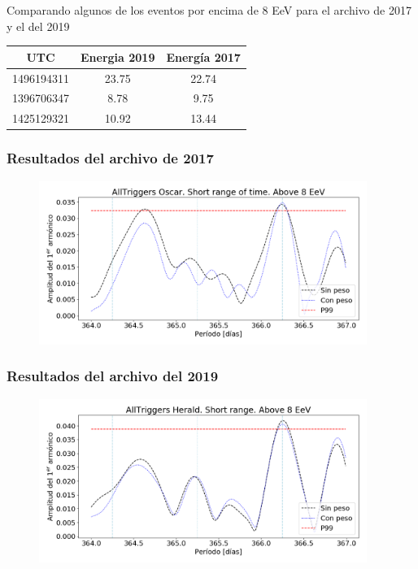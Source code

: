         Comparando algunos de los eventos por encima de 8 EeV para el archivo de 2017 y el del 2019
        \begin{table}[H]
        \centering
        
          \begin{tabular}{c| c| c}
          UTC     & Energia 2019 & Energía 2017\\ \hline
          1496194311  & 23.75      &  22.74   \\
          1396706347  & 8.78       &  9.75    \\
          1425129321  & 10.92      &  13.44   \\
          
          \end{tabular}
        \end{table}
        

      \subsubsection{Resultados del archivo de 2017}
      \begin{figure}[H]
        \centering
        \includegraphics[width=0.95\textwidth]{../0_Introduccion/AllTriggers/AllTriggers_2017_Short_range_Above_8_EeV.png}
      \end{figure}
      \subsubsection{Resultados del archivo del 2019}
      \begin{figure}[H]
        \centering
        \includegraphics[width=0.95\textwidth]{../0_Introduccion/AllTriggers/AllTriggers_2019_Short_range_Above_8_EeV.png}
      \end{figure}

